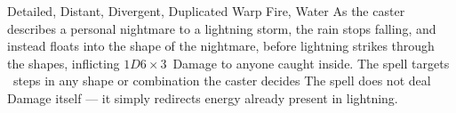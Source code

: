 
  {Detailed, Distant, Divergent, Duplicated}%
  {Warp}%
  {Fire, Water}%
  {}%
  {As the caster describes a personal nightmare to a lightning storm, the rain stops falling, and instead floats into the shape of the nightmare, before lightning strikes through the shapes, inflicting $1D6 \times 3$~Damage to anyone caught inside.
  The spell targets ~\glspl{step} in any shape or combination the caster decides}%
  {
  The \gls{spell} does not deal Damage itself --- it simply redirects energy already present in lightning.}

